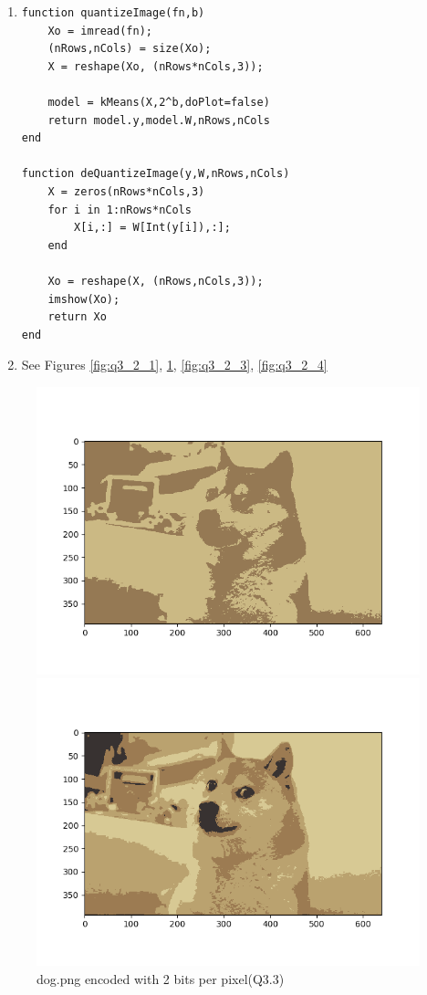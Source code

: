 \documentclass{article}
\begin{document}
\begin{enumerate}
\item
\begin{verbatim}
function quantizeImage(fn,b)
    Xo = imread(fn);
    (nRows,nCols) = size(Xo);
    X = reshape(Xo, (nRows*nCols,3));

    model = kMeans(X,2^b,doPlot=false)
    return model.y,model.W,nRows,nCols
end

function deQuantizeImage(y,W,nRows,nCols)
    X = zeros(nRows*nCols,3)
    for i in 1:nRows*nCols
        X[i,:] = W[Int(y[i]),:];
    end

    Xo = reshape(X, (nRows,nCols,3));
    imshow(Xo);
    return Xo
end
\end{verbatim}
\item See Figures \ref{fig:q3_2_1}, \ref{fig:q3_2_2}, \ref{fig:q3_2_3}, \ref{fig:q3_2_4}
\end{enumerate}
\begin{figure}
    \includegraphics[width=30em]{a2_q3_2_1.png}
    \caption{dog.png encoded with 1 bit per pixel(Q.3.3)}
    \label{fig:q3_2_1}

    \includegraphics[width=30em]{a2_q3_2_2.png}
    \caption{dog.png encoded with 2 bits per pixel(Q3.3)}
    \label{fig:q3_2_2}
\end{figure}
\end{document}
